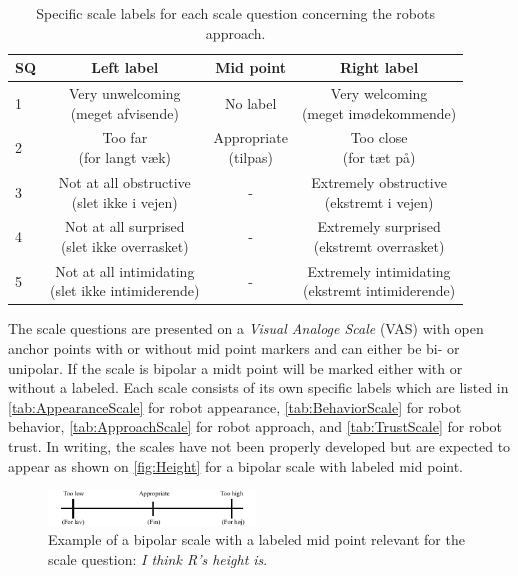 \begin{table}[H]
	\centering
\caption{Specific scale labels for each scale question concerning the robots approach.}
	\label{tab:ApproachScale} 
	\begin{tabular}{l|c|c|c}
		SQ     & Left label & Mid point & Right label \\\hline
		1   & \makecell{Very unwelcoming \\(meget afvisende)} & No label & \makecell{Very welcoming \\(meget imødekommende)}          \\\hline
		2   & \makecell{Too far \\(for langt væk)} & \makecell{Appropriate \\(tilpas)} & \makecell{Too close \\(for tæt på)}          \\\hline
		3   & \makecell{Not at all obstructive \\(slet ikke i vejen)}& -  & \makecell{Extremely obstructive \\(ekstremt i vejen)}  \\\hline
	 	4   & \makecell{Not at all surprised \\(slet ikke overrasket)} &  -  & \makecell{Extremely surprised \\(ekstremt overrasket)}       \\\hline
		5   & \makecell{Not at all intimidating \\(slet ikke intimiderende)} & - & \makecell{Extremely intimidating \\(ekstremt intimiderende)}           
	\end{tabular}
\end{table}
\noindent
%
The scale questions are presented on a \textit{Visual Analoge Scale} (VAS) with open anchor points with or without mid point markers and can either be bi- or unipolar. If the scale is bipolar a midt point will be marked either with or without a labeled. Each scale consists of its own specific labels which are listed in \autoref{tab:AppearanceScale} for robot appearance, \autoref{tab:BehaviorScale} for robot behavior, \autoref{tab:ApproachScale} for robot approach, and \autoref{tab:TrustScale} for robot trust. In writing, the scales have not been properly developed but are expected to appear as shown on \autoref{fig:Height} for a bipolar scale with labeled mid point. 
%
\begin{figure}[H]
\centering
\includegraphics[width = 0.49\textwidth]{Figure/HeightHoejde} 
\caption{Example of a bipolar scale with a labeled mid point relevant for the scale question: \textit{I think R's height is}.}
\label{fig:Height}
\end{figure}
